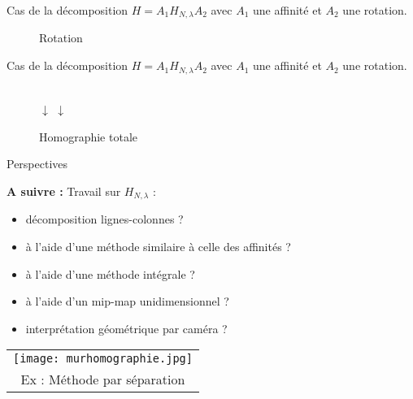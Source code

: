 \documentclass[c,12pt]{beamer}
\newcommand{\Arrow}{{ \raisebox{10\height}{\scalebox{1}{$\longrightarrow$}}}}
\begin{document}
  \begin{frame}
  Cas de la décomposition $H=A_1H_{N,\lambda}A_2$ avec $A_1$ une affinité et $A_2$ une rotation.
  \begin{figure}
   \Arrow
   \caption{Rotation}
  \end{figure}
  \end{frame}
  
  \begin{frame}
  Cas de la décomposition $H=A_1H_{N,\lambda}A_2$ avec $A_1$ une affinité et $A_2$ une rotation.
  \begin{figure}
   \raisebox{7\height}{$\longrightarrow$}
   \\
   $\downarrow$
   \phantom{$\longrightarrow$}
   \phantom{$\longrightarrow$}
   \phantom{$\longrightarrow$}
   \phantom{$\longrightarrow$}
   \phantom{$\longrightarrow$}
   $\downarrow$\\
   \raisebox{7\height}{\scalebox{1}{$\longleftarrow$}}
   \caption{Homographie totale}
  \end{figure}
  \end{frame}






\begin{frame}{Perspectives}

\textbf{A suivre :} Travail sur $H_{N,\lambda}$ :\\
	\begin{itemize}
                \item décomposition lignes-colonnes ?
                \item à l'aide d'une méthode similaire à celle des affinités ?
                \item à l'aide d'une méthode intégrale ?
                \item à l'aide d'un mip-map unidimensionnel ? 
                \item interprétation géométrique par caméra ?
                \end{itemize}
\begin{tabular}{c}
		\texttt{[image: murhomographie.jpg]}\\
                       {\small Ex : Méthode par séparation}
	\end{tabular}
\end{frame}
\end{document}
